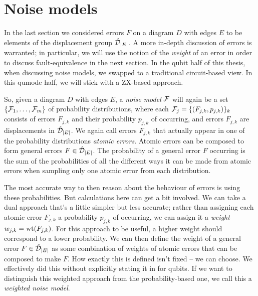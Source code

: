 \section{Noise models}

In the last section we considered errors $F$ on a diagram $D$ with edges $E$ to be elements of the displacement group $\hat{\mathcal{D}}_{|E|}$.
A more in-depth discussion of errors is warranted; in particular, we will use the notion of the \textit{weight} of an error in order to discuss fault-equivalence in the next section.
In the qubit half of this thesis, when discussing noise models, we swapped to a traditional circuit-based view.
In this qumode half, we will stick with a ZX-based approach.

So, given a diagram $D$ with edges $E$, a \textit{noise model} $\mathcal{F}$ will again be a set $\{\mathcal{F}_1, \ldots, \mathcal{F}_m\}$ of probability distributions, where each $\mathcal{F}_j = \{(F_{j,k}, p_{j,k})\}_k$ consists of errors $F_{j,k}$ and their probability $p_{j,k}$ of occurring, and errors $F_{j,k}$ are displacements in $\hat{\mathcal{D}}_{|E|}$.
We again call errors $F_{j,k}$ that actually appear in one of the probability distributions \textit{atomic errors}.
Atomic errors can be composed to form general errors $F \in \hat{\mathcal{D}}_{|E|}$.
The probability of a general error $F$ occurring is the sum of the probabilities of all the different ways it can be made from atomic errors when sampling only one atomic error from each distribution.

The most accurate way to then reason about the behaviour of errors is using these probabilities.
But calculations here can get a bit involved.
We can take a dual approach that's a little simpler but less accurate; rather than assigning each atomic error $F_{j,k}$ a probability $p_{j,k}$ of occurring, we can assign it a \textit{weight} $w_{j,k} = \operatorname{wt}(F_{j,k})$.
For this approach to be useful, a higher weight should correspond to a lower probability.
We can then define the weight of a general error $F \in \hat{\mathcal{D}}_{|E|}$ as some combination of weights of atomic errors that can be composed to make $F$.
How exactly this is defined isn't fixed -- we can choose.
We effectively did this without explicitly stating it in  for qubits.
If we want to distinguish this weighted approach from the probability-based one, we call this a \textit{weighted noise model}.

